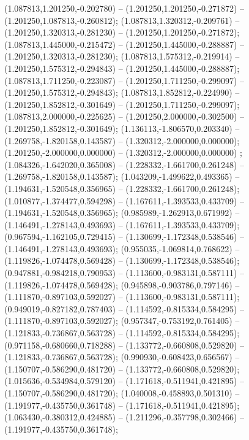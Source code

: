  (1.087813,1.201250,-0.202780) -- (1.201250,1.201250,-0.271872) -- (1.201250,1.087813,-0.260812);
 (1.087813,1.320312,-0.209761) -- (1.201250,1.320313,-0.281230) -- (1.201250,1.201250,-0.271872);
 (1.087813,1.445000,-0.215472) -- (1.201250,1.445000,-0.288887) -- (1.201250,1.320313,-0.281230);
 (1.087813,1.575312,-0.219914) -- (1.201250,1.575312,-0.294843) -- (1.201250,1.445000,-0.288887);
 (1.087813,1.711250,-0.223087) -- (1.201250,1.711250,-0.299097) -- (1.201250,1.575312,-0.294843);
 (1.087813,1.852812,-0.224990) -- (1.201250,1.852812,-0.301649) -- (1.201250,1.711250,-0.299097);
 (1.087813,2.000000,-0.225625) -- (1.201250,2.000000,-0.302500) -- (1.201250,1.852812,-0.301649);
 (1.136113,-1.806570,0.203340) -- (1.269758,-1.820158,0.143587) -- (1.320312,-2.000000,0.000000);
 (1.201250,-2.000000,0.000000) -- (1.320312,-2.000000,0.000000) ;
 (1.084326,-1.642020,0.365008) -- (1.228332,-1.661700,0.261248) -- (1.269758,-1.820158,0.143587);
 (1.043209,-1.499622,0.493365) -- (1.194631,-1.520548,0.356965) -- (1.228332,-1.661700,0.261248);
 (1.010877,-1.374477,0.594298) -- (1.167611,-1.393533,0.433709) -- (1.194631,-1.520548,0.356965);
 (0.985989,-1.262913,0.671992) -- (1.146491,-1.278143,0.493693) -- (1.167611,-1.393533,0.433709);
 (0.967594,-1.162105,0.729415) -- (1.130699,-1.172348,0.538546) -- (1.146491,-1.278143,0.493693);
 (0.955035,-1.069814,0.768622) -- (1.119826,-1.074478,0.569428) -- (1.130699,-1.172348,0.538546);
 (0.947881,-0.984218,0.790953) -- (1.113600,-0.983131,0.587111) -- (1.119826,-1.074478,0.569428);
 (0.945898,-0.903786,0.797146) -- (1.111870,-0.897103,0.592027) -- (1.113600,-0.983131,0.587111);
 (0.949019,-0.827182,0.787403) -- (1.114592,-0.815334,0.584295) -- (1.111870,-0.897103,0.592027);
 (0.957347,-0.753192,0.761405) -- (1.121833,-0.736867,0.563728) -- (1.114592,-0.815334,0.584295);
 (0.971158,-0.680660,0.718288) -- (1.133772,-0.660808,0.529820) -- (1.121833,-0.736867,0.563728);
 (0.990930,-0.608423,0.656567) -- (1.150707,-0.586290,0.481720) -- (1.133772,-0.660808,0.529820);
 (1.015636,-0.534984,0.579120) -- (1.171618,-0.511941,0.421895) -- (1.150707,-0.586290,0.481720);
 (1.040008,-0.458893,0.501310) -- (1.191977,-0.435750,0.361748) -- (1.171618,-0.511941,0.421895);
 (1.063430,-0.380312,0.424885) -- (1.211296,-0.357798,0.302466) -- (1.191977,-0.435750,0.361748);

